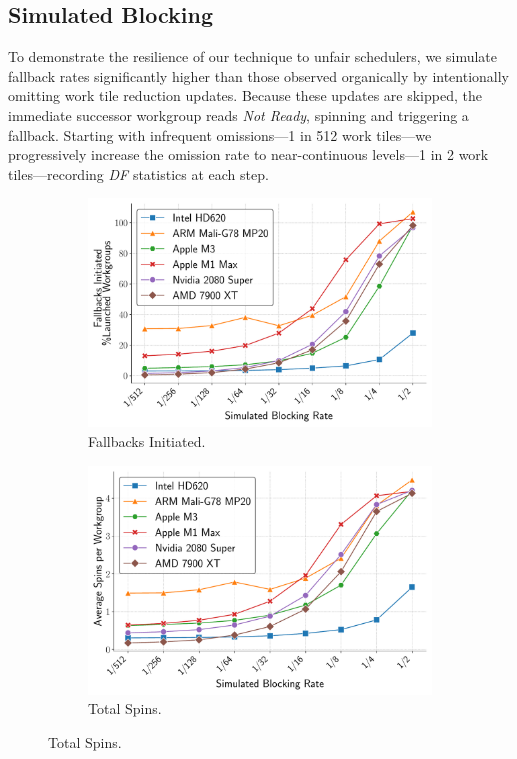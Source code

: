 \documentclass[acmsmall, manuscript, screen, review, anonymous]{acmart}
\begin{document}
\subsection{Simulated Blocking}%
\label{sec:Sim-Blocking}
To demonstrate the resilience of our technique to unfair schedulers, we simulate fallback rates significantly higher than those observed organically by intentionally omitting work tile reduction updates. Because these updates are skipped, the immediate successor workgroup reads \emph{Not Ready}, spinning and triggering a fallback. Starting with infrequent omissions---1 in 512 work tiles---we progressively increase the omission rate to near-continuous levels---1 in 2 work tiles---recording \emph{DF} statistics at each step.
\begin{figure}
  \centering
  \begin{subfigure}[t]{0.48\linewidth}
    \centering
    \includegraphics[width=\linewidth]{graphics/fallbacksInitiated_plot.pdf}
    \caption{Fallbacks Initiated.\label{fig:fallbacks_initiated}}
  \end{subfigure}\hfill
  \begin{subfigure}[t]{0.48\linewidth}
    \centering
    \includegraphics[width=\linewidth]{graphics/totalSpins_plot.pdf}
    \caption{Total Spins.\label{fig:total_spins}}
  \end{subfigure}


\end{figure}
\end{document}
